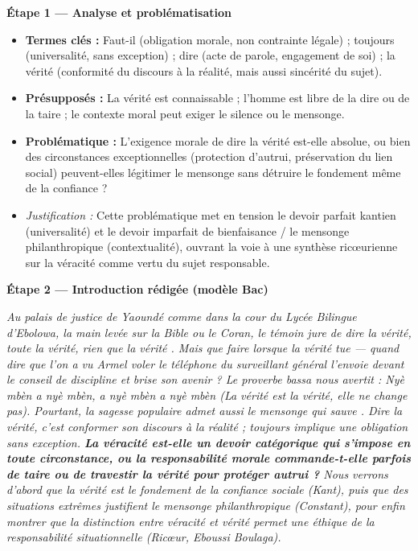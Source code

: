 \documentclass[11pt]{article}
\newcommand{\cle}[1]{{\popxbold\color{popdark}#1}}
\newcounter{popsec}
\newcounter{popsub}
\newcommand{\courssub}[1]{%
  \stepcounter{popsub}%
  \par\vspace{9pt}\noindent{\popxbold\fontsize{11.5}{13}\selectfont\color{popink}{\color{poporange}\thepopsec.\thepopsub}\hspace{6pt}#1}\par\nopagebreak\vspace{4pt}
}
\begin{document}
\courssub{Démarche et corrigé commenté}
\begin{exoresolu}
\textbf{Étape 1 — Analyse et problématisation}

\begin{itemize}
    \item \textbf{Termes clés :} \guillemotleft Faut-il \guillemotright (obligation morale, non contrainte légale) ; \guillemotleft toujours \guillemotright (universalité, sans exception) ; \guillemotleft dire \guillemotright (acte de parole, engagement de soi) ; \guillemotleft la vérité \guillemotright (conformité du discours à la réalité, mais aussi sincérité du sujet).
    \item \textbf{Présupposés :} La vérité est connaissable ; l'homme est libre de la dire ou de la taire ; le contexte moral peut exiger le silence ou le mensonge.
    \item \textbf{Problématique :} \guillemotleft L'exigence morale de dire la vérité est-elle absolue, ou bien des circonstances exceptionnelles (protection d'autrui, préservation du lien social) peuvent-elles légitimer le mensonge sans détruire le fondement même de la confiance ? \guillemotright
    \item \emph{Justification :} Cette problématique met en tension le \cle{devoir parfait} kantien (universalité) et le \cle{devoir imparfait} de bienfaisance / le \cle{mensonge philanthropique} (contextualité), ouvrant la voie à une synthèse ricœurienne sur la \cle{véracité} comme vertu du sujet responsable.
\end{itemize}

\textbf{Étape 2 — Introduction rédigée (modèle Bac)}

\guillemotleft \emph{Au palais de justice de Yaoundé comme dans la cour du Lycée Bilingue d'Ebolowa, la main levée sur la Bible ou le Coran, le témoin jure de \guillemotleft dire la vérité, toute la vérité, rien que la vérité \guillemotright. Mais que faire lorsque la vérité tue — quand dire que l'on a vu Armel voler le téléphone du surveillant général l'envoie devant le conseil de discipline et brise son avenir ? Le proverbe bassa nous avertit : \guillemotleft \emph{Nyè mbèn a nyè mbèn, a nyè mbèn a nyè mbèn} \guillemotright (La vérité est la vérité, elle ne change pas). Pourtant, la sagesse populaire admet aussi le \guillemotleft mensonge qui sauve \guillemotright. Dire la vérité, c'est conformer son discours à la réalité ; \guillemotleft toujours \guillemotright implique une obligation sans exception. \textbf{La véracité est-elle un devoir catégorique qui s'impose en toute circonstance, ou la responsabilité morale commande-t-elle parfois de taire ou de travestir la vérité pour protéger autrui ?} Nous verrons d'abord que la vérité est le fondement de la confiance sociale (Kant), puis que des situations extrêmes justifient le mensonge philanthropique (Constant), pour enfin montrer que la distinction entre véracité et vérité permet une éthique de la responsabilité situationnelle (Ricœur, Eboussi Boulaga).}\guillemotright


\end{exoresolu}
\end{document}
